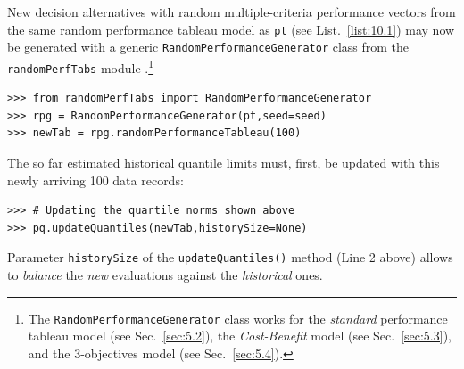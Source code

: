 New  decision alternatives with random multiple-criteria performance vectors from the same random performance tableau model as \texttt{pt} (see List.~\vref{list:10.1}) may now be generated with a generic \texttt{RandomPerformanceGene\-rator} class from the \texttt{randomPerfTabs} module \citep{BIS-2021b}.\footnote{The \texttt{RandomPerformanceGenerator} class works for the \emph{standard} performance tableau model (see Sec.~\ref{sec:5.2}), the \emph{Cost-Benefit} model (see Sec.~\ref{sec:5.3}), and the 3-objectives model (see Sec.~\ref{sec:5.4}).}
\begin{lstlisting}[caption={Generating 100 new random decision alternatives of the same model},label=list:10.3]
>>> from randomPerfTabs import RandomPerformanceGenerator
>>> rpg = RandomPerformanceGenerator(pt,seed=seed)
>>> newTab = rpg.randomPerformanceTableau(100)
\end{lstlisting}

The so far estimated historical quantile limits must, first, be updated with this newly arriving 100 data records:
\begin{lstlisting}
>>> # Updating the quartile norms shown above 
>>> pq.updateQuantiles(newTab,historySize=None)
\end{lstlisting}
Parameter \texttt{historySize} of the \texttt{updateQuantiles()} method (Line 2 above) allows to \emph{balance} the \emph{new} evaluations against the \emph{historical} ones.

